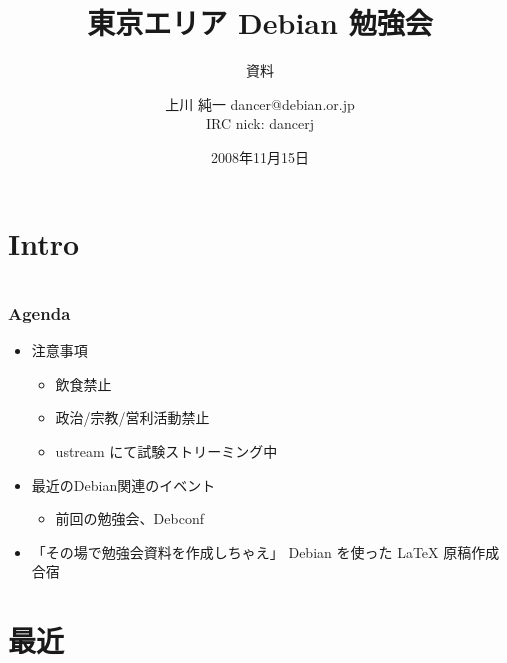 \documentclass[cjk,dvipdfmx,12pt]{beamer}
\title{東京エリア Debian 勉強会}
\subtitle{資料}
\author{上川 純一 dancer@debian.or.jp\\IRC nick: dancerj}
\date{2008年11月15日}
\begin{document}
\frame{\titlepage{}}


\section{Intro}


\section{}
\begin{frame}
 \frametitle{Agenda}
\begin{minipage}[t]{0.45\hsize}
  \begin{itemize}
  \item 注意事項
	\begin{itemize}
	 \item 飲食禁止
	 \item 政治/宗教/営利活動禁止
	 \item ustream にて試験ストリーミング中
	\end{itemize}
  \item 最近のDebian関連のイベント
	\begin{itemize}
	 \item 前回の勉強会、Debconf
	\end{itemize}
 \end{itemize}
\end{minipage} 
\begin{minipage}[t]{0.45\hsize}
 \begin{itemize}
  \item 「その場で勉強会資料を作成しちゃえ」 Debian を使った LaTeX 原稿作成合宿
 \end{itemize}
\end{minipage}
\end{frame}

\section{最近}
\end{document}
